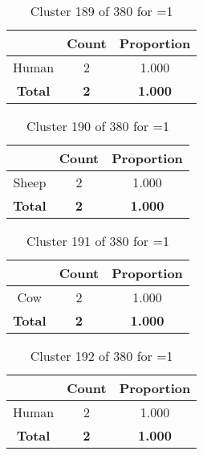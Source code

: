 \begin{table}[ht!]
\centering
\begin{tabular}{|c|c|c|}
\hline
\bf \Spec{} &\bf Count &\bf Proportion\\ \hline \hline
Human & 2 & 1.000\\ \hline
\hline
\bf Total & \bf 2 & \bf 1.000\\ \hline
\end{tabular}
\label{tab:cluster:189:1}
\caption{Cluster 189 of 380 for \minneigh{}=1}
\end{table}

\clearpage
\begin{table}[ht!]
\centering
\begin{tabular}{|c|c|c|}
\hline
\bf \Spec{} &\bf Count &\bf Proportion\\ \hline \hline
Sheep & 2 & 1.000\\ \hline
\hline
\bf Total & \bf 2 & \bf 1.000\\ \hline
\end{tabular}
\label{tab:cluster:190:1}
\caption{Cluster 190 of 380 for \minneigh{}=1}
\end{table}

\begin{table}[ht!]
\centering
\begin{tabular}{|c|c|c|}
\hline
\bf \Spec{} &\bf Count &\bf Proportion\\ \hline \hline
Cow & 2 & 1.000\\ \hline
\hline
\bf Total & \bf 2 & \bf 1.000\\ \hline
\end{tabular}
\label{tab:cluster:191:1}
\caption{Cluster 191 of 380 for \minneigh{}=1}
\end{table}

\begin{table}[ht!]
\centering
\begin{tabular}{|c|c|c|}
\hline
\bf \Spec{} &\bf Count &\bf Proportion\\ \hline \hline
Human & 2 & 1.000\\ \hline
\hline
\bf Total & \bf 2 & \bf 1.000\\ \hline
\end{tabular}
\label{tab:cluster:192:1}
\caption{Cluster 192 of 380 for \minneigh{}=1}
\end{table}

